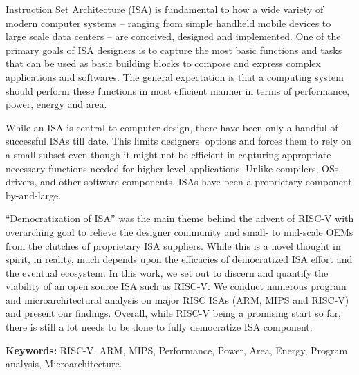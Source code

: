 

Instruction Set Architecture (ISA) is fundamental to how a wide variety of modern computer systems -- ranging from simple handheld mobile devices to large scale data centers -- are conceived, designed and implemented. One of the primary goals of ISA designers is to capture the most basic functions and tasks that can be used as basic building blocks to compose and express complex applications and softwares. The general expectation is that a computing system should perform these functions in most efficient manner in terms of performance, power, energy and area. 

While an ISA is central to computer design, there have been only a handful of successful ISAs till date. This limits designers' options and forces them to rely on a small subset even though it might not be efficient in capturing appropriate necessary functions needed for higher level applications. Unlike compilers, OSs, drivers, and other software components, ISAs have been a proprietary component by-and-large.

``Democratization of ISA'' was the main theme behind the advent of RISC-V with overarching goal to relieve the designer community and small- to mid-scale OEMs from the clutches of proprietary ISA suppliers. While this is a novel thought in spirit, in reality, much depends upon the efficacies of democratized ISA effort and the eventual ecosystem. In this work, we set out to discern and quantify the viability of an open source ISA such as RISC-V. We conduct numerous program and microarchitectural analysis on major RISC ISAs (ARM, MIPS and RISC-V) and present our findings. Overall, while RISC-V being a promising start so far, there is still a lot needs to be done to fully democratize ISA component.  

\vspace{0.5em}
\noindent
\textbf{Keywords:} RISC-V, ARM, MIPS, Performance, Power, Area, Energy, Program analysis, Microarchitecture.





